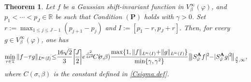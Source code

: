 \documentclass[10pt,a4paper]{amsart}
\newtheorem{theorem}{Theorem}
\begin{document}
\begin{theorem}\label{stable.thm2}
Let $f$ be a Gaussian shift-invariant function in $V_\beta^\infty(\varphi)$, and 
$
p_1<\cdots<p_J\in\mathbb R$ 
be such that Condition $(\mathbf P)$ holds with $\gamma>0$. Set $
r:=\max_{1\le j\le J-1}(p_{j+1}-p_j)$ and $
I:=[p_1-r,p_J+r].$ 
Then, for every $g\in V_{\beta}^{\infty}(\varphi)$, one has
\begin{align}\label{stable.const}
\min_{\tau\in\mathbb T}\|f\hskip-.03in-\hskip-.03in\tau g\|_{L\hskip-.02in^\infty(\hskip-.01in I \hskip-.01in)}\hskip-.03in \le\hskip-.04in
\frac{16\sqrt{2}}{3} \hskip-.03in\left\lceil\hskip-.03in\frac{J}{2}\hskip-.03in\right\rceil \hskip-.03ine^{\frac{r^2}{4\sigma^2}}
\hskip-.03inC(\hskip-.03in\sigma,\hskip-.03in\beta)
\frac{\max\{1,\|f\|_{L\hskip-.02in^\infty(I)}\hskip-.03in+\hskip-.03in\|g\|_{L\hskip-.02in^\infty(I)}\}}{\min\{\gamma,\gamma^2\}}
\bigl\|\hskip-.02in|S_{\check{\varphi}}^{\mathbf A}f|\hskip-.01in^2\hskip-.04in-\hskip-.03in|S_{\check{\varphi}}^{\mathbf A}g|\hskip-.01in^2\hskip-.02in\bigr\|_{\frac{\beta}{2},\infty},
\end{align}
where $C(\sigma,\beta)$ is the constant defined in \eqref{Csigma.def}.
\end{theorem}
\end{document}
